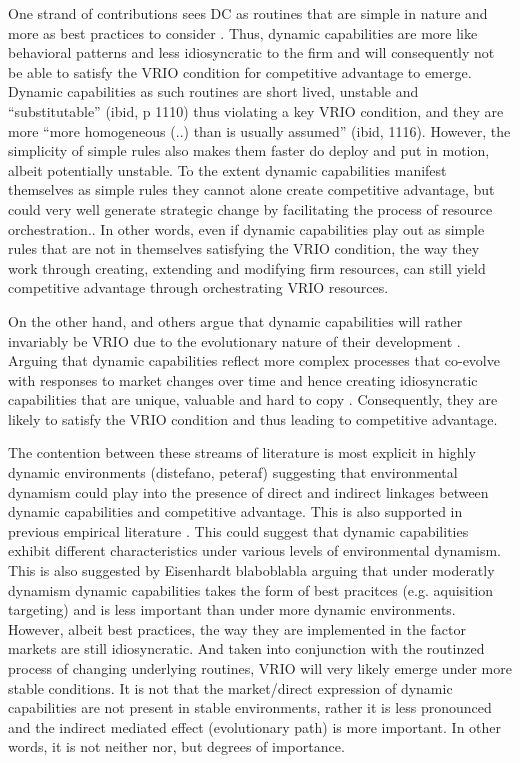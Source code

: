 \documentclass[review,fleqn]{elsarticle}\usepackage[]{graphicx}\usepackage[]{color}
\begin{document}
One strand of contributions sees DC as routines that are simple in nature and more as best
practices to consider \citep{Eisenhardt2000}. Thus, dynamic capabilities are more like
behavioral patterns and less idiosyncratic to the firm and will consequently not be able
to satisfy the VRIO condition for competitive advantage to emerge. Dynamic capabilities as
such routines are short lived, unstable and “substitutable” (ibid, p 1110) thus violating
a key VRIO condition, and they are more “more homogeneous (..) than is usually assumed”
(ibid, 1116). However, the simplicity of simple rules also makes them faster do deploy and
put in motion, albeit potentially unstable. To the extent dynamic capabilities manifest
themselves as simple rules they cannot alone create competitive advantage, but could very
well generate strategic change by facilitating the process of resource orchestration.. In
other words, even if dynamic capabilities play out as simple rules that are not in
themselves satisfying the VRIO condition, the way they work through creating, extending
and modifying firm resources, can still yield competitive advantage through orchestrating
VRIO resources.

On the other hand, \cite{Teece1997} and others \cite{Helfat2007} argue that dynamic
capabilities will rather invariably be VRIO due to the evolutionary nature of their
development \citep{Arndt2018,Peteraf2013}. Arguing that dynamic capabilities reflect more
complex processes that co-evolve with responses to market changes over time and hence
creating idiosyncratic capabilities that are unique, valuable and hard to copy
\citep{Helfat2007,Arndt2018}. Consequently, they are likely to satisfy the VRIO condition
and thus leading to competitive advantage.

The contention between these streams of literature is most explicit in highly dynamic
environments (distefano, peteraf) suggesting that environmental dynamism could play into
the presence of direct and indirect linkages between dynamic capabilities and competitive
advantage. This is also supported in previous empirical literature \citep{Schilke2014}.
This could suggest that dynamic capabilities exhibit different characteristics under
various levels of environmental dynamism. This is also suggested by Eisenhardt blaboblabla
arguing that under moderatly dynamism dynamic capabilities takes the form of best
pracitces (e.g. aquisition targeting) and is less important than under more dynamic
environments. However, albeit best practices, the way they are implemented in the factor
markets are still idiosyncratic. And taken into conjunction with the routinzed process of
changing underlying routines, VRIO will very likely emerge under more stable
conditions. It is not that the market/direct expression of dynamic capabilities are not
present in stable environments, rather it is less pronounced and the indirect mediated
effect (evolutionary path) is more important. In other words, it is not neither nor, but
degrees of importance.
\end{document}
